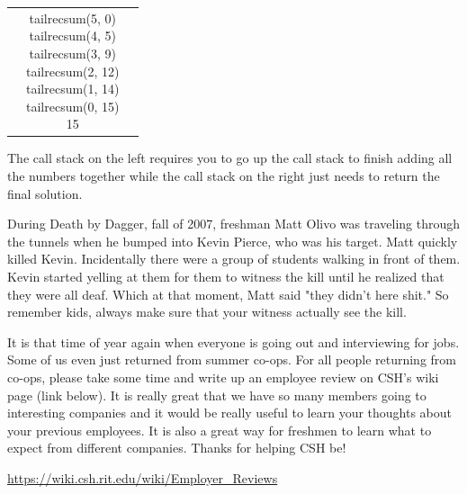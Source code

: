 \documentclass[9pt]{extarticle} %
\begin{document}
\begin{minipage}[t]{.66\linewidth}
\begin{tabular}{ l c r }
&
\makecell{
tailrecsum(5, 0) \\
tailrecsum(4, 5) \\
tailrecsum(3, 9) \\
tailrecsum(2, 12) \\
tailrecsum(1, 14) \\
tailrecsum(0, 15) \\
15 \\}
\end{tabular}

The call stack on the left requires you to go up the call stack to finish
adding all the numbers together while the call stack on the right just
needs to return the final solution.


\hypertarget{secondnews}{} 

During Death by Dagger, fall of 2007, freshman Matt Olivo was traveling 
through the tunnels when he bumped into Kevin Pierce, who was his target.
Matt quickly killed Kevin. Incidentally there were a group of students walking
in front of them. Kevin started yelling at them for them to witness the kill
until he realized that they were all deaf. Which at that moment, Matt said 
"they didn't here shit." So remember kids, always make sure that your witness
actually see the kill.

\hypertarget{thirdnews}{} 

It is that time of year again when everyone is going out and interviewing for 
jobs. Some of us even just returned from summer co-ops. For all people returning from co-ops, please take some time and write up an employee review on CSH's 
wiki page (link below). It is really great that we have so many members going
to interesting companies and it would be really useful to learn your thoughts
about your previous employees. It is also a great way for freshmen to learn 
what to expect from different companies. Thanks for helping CSH be!
\centerline{\url{https://wiki.csh.rit.edu/wiki/Employer_Reviews}}

\end{minipage} %
\end{document}
